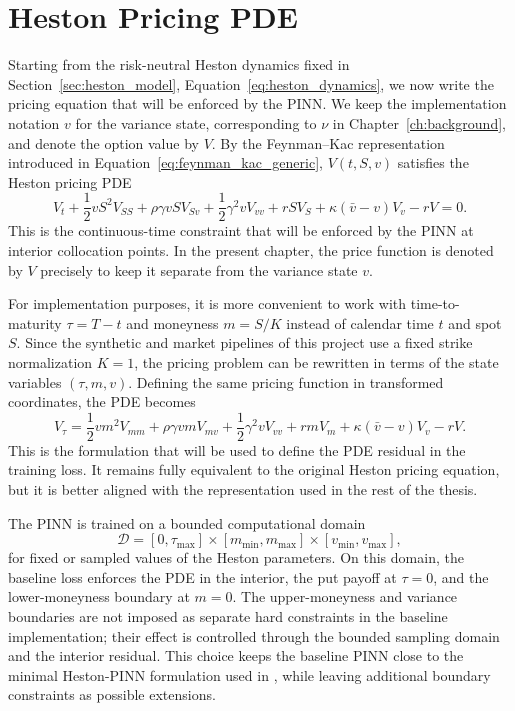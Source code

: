 \section{Heston Pricing PDE}

Starting from the risk-neutral Heston dynamics fixed in Section~\ref{sec:heston_model}, Equation~\eqref{eq:heston_dynamics}, we now write the pricing equation that will be enforced by the PINN. We keep the implementation notation \(v\) for the variance state, corresponding to \(\nu\) in Chapter~\ref{ch:background}, and denote the option value by \(V\). By the Feynman--Kac representation introduced in Equation~\eqref{eq:feynman_kac_generic}, \(V(t,S,v)\) satisfies the Heston pricing PDE \cite{heston}
\begin{equation}
V_t
+\frac{1}{2}vS^2V_{SS}
+\rho\gamma vS V_{Sv}
+\frac{1}{2}\gamma^2 v V_{vv}
+rS V_S
+\kappa(\bar v-v)V_v
-rV = 0.
\end{equation}
This is the continuous-time constraint that will be enforced by the PINN at interior collocation points. In the present chapter, the price function is denoted by $V$ precisely to keep it separate from the variance state $v$.

For implementation purposes, it is more convenient to work with time-to-maturity $\tau=T-t$ and moneyness $m=S/K$ instead of calendar time $t$ and spot $S$. Since the synthetic and market pipelines of this project use a fixed strike normalization $K=1$, the pricing problem can be rewritten in terms of the state variables $(\tau,m,v)$. Defining the same pricing function in transformed coordinates, the PDE becomes
\begin{equation}
V_\tau
=\frac{1}{2}vm^2V_{mm}
+\rho\gamma vm V_{mv}
+\frac{1}{2}\gamma^2 v V_{vv}
+rm V_m
+\kappa(\bar v-v)V_v
-rV.
\end{equation}
This is the formulation that will be used to define the PDE residual in the training loss. It remains fully equivalent to the original Heston pricing equation, but it is better aligned with the representation used in the rest of the thesis.

The PINN is trained on a bounded computational domain
\[
\mathcal{D}=[0,\tau_{\max}]\times[m_{\min},m_{\max}]\times[v_{\min},v_{\max}],
\]
for fixed or sampled values of the Heston parameters. On this domain, the baseline loss enforces the PDE in the interior, the put payoff at \(\tau=0\), and the lower-moneyness boundary at \(m=0\). The upper-moneyness and variance boundaries are not imposed as separate hard constraints in the baseline implementation; their effect is controlled through the bounded sampling domain and the interior residual. This choice keeps the baseline PINN close to the minimal Heston-PINN formulation used in \cite{hainaut2024pinn}, while leaving additional boundary constraints as possible extensions.

